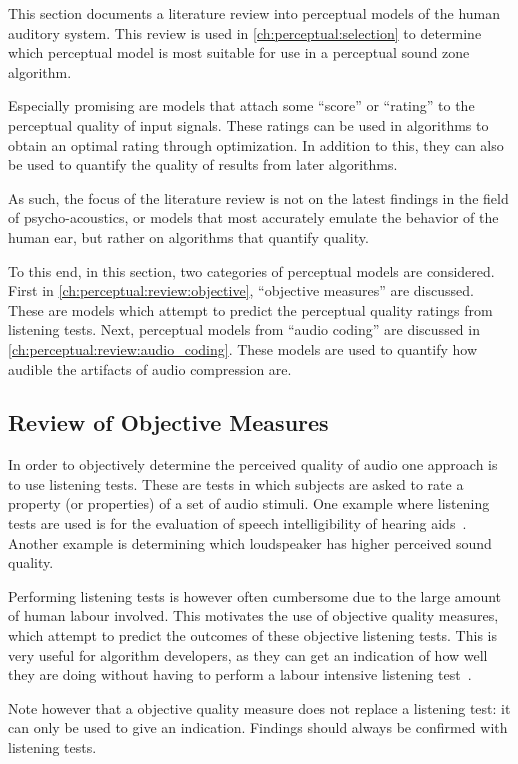 This section documents a literature review into perceptual models of the human auditory system.
This review is used in \autoref{ch:perceptual:selection} to determine which perceptual model is most 
suitable for use in a perceptual sound zone algorithm.

Especially promising are models that attach some ``score'' or ``rating'' to the perceptual quality of input signals.
These ratings can be used in algorithms to obtain an optimal rating through optimization.
In addition to this, they can also be used to quantify the quality of results from later algorithms.

As such, the focus of the literature review is not on the latest findings in the field of psycho-acoustics, or models 
that most accurately emulate the behavior of the human ear, but rather on algorithms that quantify quality.

To this end, in this section, two categories of perceptual models are considered.
First in \autoref{ch:perceptual:review:objective}, ``objective measures'' are discussed.
These are models which attempt to predict the perceptual quality ratings from listening tests. 
Next, perceptual models from ``audio coding'' are discussed in \autoref{ch:perceptual:review:audio_coding}.
These models are used to quantify how audible the artifacts of audio compression are.

\subsection{Review of Objective Measures}
\label{ch:perceptual:review:objective}
In order to objectively determine the perceived quality of audio one approach is to use listening tests.
These are tests in which subjects are asked to rate a property (or properties) of a set of audio stimuli.
One example where listening tests are used is for the evaluation of speech intelligibility of hearing aids~\cite{taal2011algorithm}.
Another example is determining which loudspeaker has higher perceived sound quality.

Performing listening tests is however often cumbersome due to the large amount of human labour involved.
This motivates the use of objective quality measures, which attempt to predict the outcomes of these objective listening tests.
This is very useful for algorithm developers, as they can get an indication of how well they are doing
without having to perform a labour intensive listening test~\cite{taal2011algorithm}.

Note however that a objective quality measure does not replace a listening test: it can only be used to give an 
indication.
Findings should always be confirmed with listening tests.

